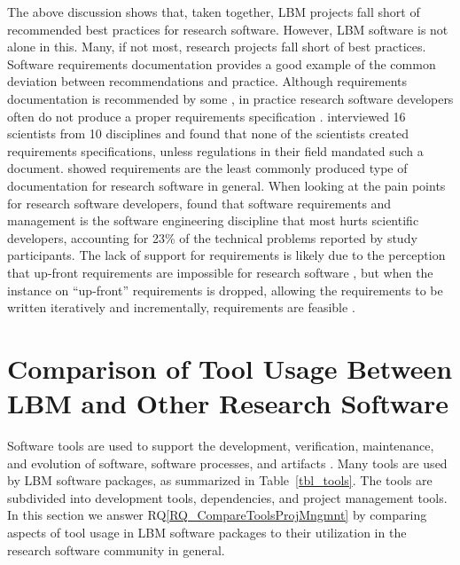 \documentclass[final, 3p, times, authoryear]{elsarticle}
\newcommand{\rqref}[1]{RQ\ref{#1}}
\begin{document}
The above discussion shows that, taken together, LBM projects fall short of
recommended best practices for research software.  However, LBM software is not
alone in this.  Many, if not most, research projects fall short of best
practices.  Software requirements documentation provides a good example of the
common deviation between recommendations and practice.  Although requirements
documentation is recommended by some \citep{TobiasEtAl2018, HerouxEtAl2008,
SmithAndKoothoor2016}, in practice research software developers often do not
produce a proper requirements specification \citep{HeatonAndCarver2015}.
\citet{SandersAndKelly2008} interviewed 16 scientists from 10 disciplines and
found that none of the scientists created requirements specifications, unless
regulations in their field mandated such a document. \citet{Nguyen-HoanEtAl2010}
showed requirements are the least commonly produced type of documentation for
research software in general. When looking at the pain points for research
software developers, \citet{WieseEtAl2019} found that software requirements and
management is the software engineering discipline that most hurts scientific
developers, accounting for 23\% of the technical problems reported by study
participants.  The lack of support for requirements is likely due to the
perception that up-front requirements are impossible for research software
\citep{CarverEtAl2007,SegalAndMorris2008}, but when the instance on ``up-front''
requirements is dropped, allowing the requirements to be written iteratively and
incrementally, requirements are feasible \citep{Smith2016}.

\section{Comparison of Tool Usage Between LBM and Other Research Software}
\label{Sec_CompareTools}

Software tools are used to support the development, verification, maintenance,
and evolution of software, software processes, and artifacts \citep[p.\
501]{GhezziEtAl2003}. Many tools are used by LBM software packages, as
summarized in Table~\ref{tbl_tools}.  The tools are subdivided into development
tools, dependencies, and project management tools.  In this section we answer
\rqref{RQ_CompareToolsProjMngmnt} by comparing aspects of tool usage in LBM
software packages to their utilization in the research software community in
general.
\end{document}
